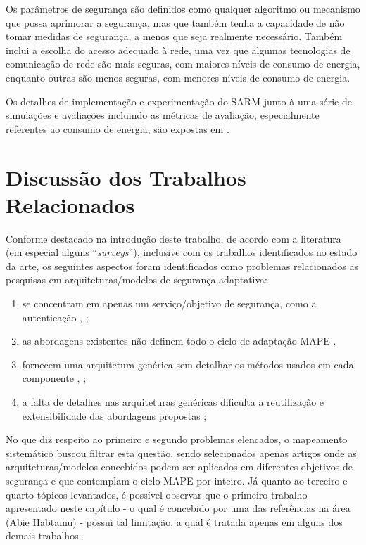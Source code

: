 \documentclass[tid,table]{texufpel} %
\begin{document}
Os parâmetros de segurança são definidos como qualquer algoritmo ou mecanismo que possa aprimorar a segurança, mas que também tenha a capacidade de não tomar medidas de segurança, a menos que seja realmente necessário. Também inclui a escolha do acesso adequado à rede, uma vez que algumas tecnologias de comunicação de rede são mais seguras, com maiores níveis de consumo de energia, enquanto outras são menos seguras, com menores níveis de consumo de energia.

Os detalhes de implementação e experimentação do SARM junto à uma série de simulações e avaliações incluindo as métricas de avaliação, especialmente referentes ao consumo de energia, são expostas em \cite{elmaliki14}.


\section{Discussão dos Trabalhos Relacionados}

Conforme destacado na introdução deste trabalho, de acordo com a literatura (em especial alguns ``\textit{surveys}''), inclusive com os trabalhos identificados no estado da arte, os seguintes aspectos foram identificados como problemas relacionados as pesquisas em arquiteturas/modelos de segurança adaptativa:

\begin{enumerate}
\item  se concentram em apenas um serviço/objetivo de segurança, como a autenticação \cite{aman14}, \cite{elkhodary07};
\item as abordagens existentes não definem todo o ciclo de adaptação MAPE \cite{yuan12}.
\item fornecem uma arquitetura genérica sem detalhar os métodos usados em cada componente  \cite{aman14}, \cite{yuan12};
\item a falta de detalhes nas arquiteturas genéricas dificulta a reutilização e extensibilidade das abordagens propostas \cite{yuan12};
\end{enumerate}

No que diz respeito ao primeiro e segundo problemas elencados, o mapeamento sistemático buscou filtrar esta questão, sendo selecionados apenas artigos onde as arquiteturas/modelos concebidos podem ser aplicados em diferentes objetivos de segurança e que contemplam o ciclo MAPE por inteiro. Já quanto ao terceiro e quarto tópicos levantados, é possível observar que o primeiro trabalho apresentado neste capítulo \cite{habtamu12} - o qual é concebido por uma das referências na área (Abie Habtamu) - possui tal limitação, a qual é tratada apenas em alguns dos demais trabalhos.
\end{document}
